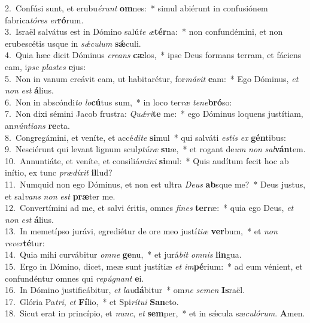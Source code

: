 {2.~}Confúsi sunt, et erubu\textit{é}\textit{runt} \textbf{om}nes:~* simul abiérunt in confusiónem fabrica\textit{tó}\textit{res} \textit{er}\textbf{ró}rum.\\
{3.~}Israël salvátus est in Dómino salú\textit{te} \textit{æ}\textbf{tér}na:~* non confundémini, et non erubescétis usque in \textit{sǽ}\textit{cu}\textit{lum} \textbf{sǽ}culi.\\
{4.~}Quia hæc dicit Dóminus \textit{cre}\textit{ans} \textbf{cæ}los,~* ipse Deus formans terram, et fáciens eam, i\textit{pse} \textit{pla}\textit{stes} \textbf{e}jus:\\
{5.~}Non in vanum creávit eam, ut habitarétur, for\textit{má}\textit{vit} \textbf{e}am:~* Ego Dóminus, \textit{et} \textit{non} \textit{est} \textbf{á}lius.\\
{6.~}Non in abscóndi\textit{to} \textit{lo}\textbf{cú}tus sum,~* in loco ter\textit{ræ} \textit{te}\textit{ne}\textbf{bró}so:\\
{7.~}Non dixi sémini Jacob frustra: \textit{Quǽ}\textit{ri}\textbf{te} me:~* ego Dóminus loquens justítiam, an\textit{nún}\textit{ti}\textit{ans} \textbf{re}cta.\\
{8.~}Congregámini, et veníte, et accé\textit{di}\textit{te} \textbf{si}mul~* qui salváti \textit{e}\textit{stis} \textit{ex} \textbf{gén}tibus:\\
{9.~}Nesciérunt qui levant lignum scul\textit{ptú}\textit{ræ} \textbf{su}æ,~* et rogant de\textit{um} \textit{non} \textit{sal}\textbf{ván}tem.\\
{10.~}Annuntiáte, et veníte, et consiliá\textit{mi}\textit{ni} \textbf{si}mul:~* Quis audítum fecit hoc ab inítio, ex tunc \textit{præ}\textit{dí}\textit{xit} \textbf{il}lud?\\
{11.~}Numquid non ego Dóminus, et non est ultra \textit{De}\textit{us} \textbf{ab}sque me?~* Deus justus, et sal\textit{vans} \textit{non} \textit{est} \textbf{præ}ter me.\\
{12.~}Convertímini ad me, et salvi éritis, omnes \textit{fi}\textit{nes} \textbf{ter}ræ:~* quia ego Deus, \textit{et} \textit{non} \textit{est} \textbf{á}lius.\\
{13.~}In memetípso jurávi, egrediétur de ore meo justí\textit{ti}\textit{æ} \textbf{ver}bum,~* et \textit{non} \textit{re}\textit{ver}\textbf{té}tur:\\
{14.~}Quia mihi curvábitur \textit{om}\textit{ne} \textbf{ge}nu,~* et jurá\textit{bit} \textit{om}\textit{nis} \textbf{lin}gua.\\
{15.~}Ergo in Dómino, dicet, meæ sunt justítiæ \textit{et} \textit{im}\textbf{pé}rium:~* ad eum vénient, et confundéntur omnes qui \textit{re}\textit{pú}\textit{gnant} \textbf{e}i.\\
{16.~}In Dómino justificábitur, \textit{et} \textit{lau}\textbf{dá}bitur~* om\textit{ne} \textit{se}\textit{men} \textbf{Is}raël.\\
{17.~}Glória Pa\textit{tri}, \textit{et} \textbf{Fí}lio,~* et Spi\textit{rí}\textit{tu}\textit{i} \textbf{San}cto.\\
{18.~}Sicut erat in princípio, et \textit{nunc}, \textit{et} \textbf{sem}per,~* et in sǽcula sæ\textit{cu}\textit{ló}\textit{rum}. \textbf{A}men.\\
